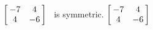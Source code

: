 {$\left[\hskip -3pt \begin{array}{cc} -7&4\\  4&-6\end {array} \hskip -3pt
 \right]$ }
{\tta\ is symmetric. $\left[\hskip -3pt \begin{array}{cc} -7&4\\  4&-6\end {array} \hskip -3pt
 \right]$ }



